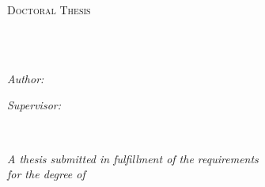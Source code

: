 \documentclass[
11pt, %
english, %
singlespacing, %
headsepline, %
]{MastersDoctoralThesis} %
\author{Huy Anh \textsc{Le}} %
\begin{document}
\frontmatter %

\pagestyle{plain} %


\begin{titlepage}
\begin{center}

\vspace*{.06\textheight}
{\scshape\LARGE \univname\par}\vspace{1.5cm} %

\textsc{\Large Doctoral Thesis}\\[0.5cm] %

\HRule \\[0.4cm] %
{\huge \bfseries \ttitle\par}\vspace{0.4cm} %
\HRule \\[1.5cm] %
 
\begin{minipage}[t]{0.4\textwidth}
\begin{flushleft} \large
\emph{Author:}\\
\href{http://www.johnsmith.com}{\authorname} %
\end{flushleft}
\end{minipage}
\begin{minipage}[t]{0.4\textwidth}
\begin{flushright} \large
\emph{Supervisor:} \\
\href{http://www.jamessmith.com}{\supname} %
\end{flushright}
\end{minipage}\\[3cm]
 
\vfill

\large \textit{A thesis submitted in fulfillment of the requirements\\ for the degree of \degreename}\\[0.3cm] %


\end{center}
\end{titlepage}
\end{document}
